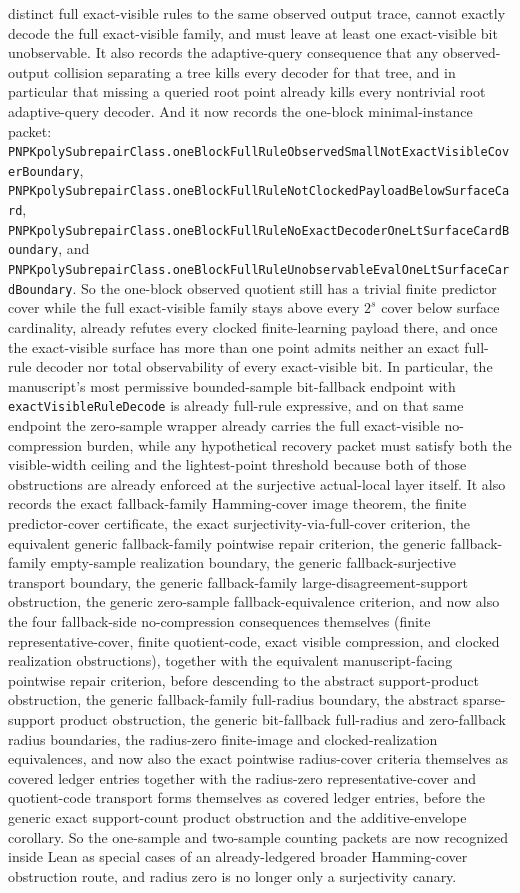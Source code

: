 \documentclass[11pt]{article}
\theoremstyle{remark}
\begin{document}
distinct full exact-visible rules to the same observed output trace, cannot
exactly decode the full exact-visible family, and must leave at least one
exact-visible bit unobservable.
It also records the adaptive-query consequence that any observed-output
collision separating a tree kills every decoder for that tree, and in
particular that missing a queried root point already kills every nontrivial
root adaptive-query decoder.
And it now records the one-block minimal-instance packet:
\texttt{PNPKpolySubrepairClass.oneBlockFullRuleObservedSmallNotExactVisibleCoverBoundary},
\texttt{PNPKpolySubrepairClass.oneBlockFullRuleNotClockedPayloadBelowSurfaceCard},
\texttt{PNPKpolySubrepairClass.oneBlockFullRuleNoExactDecoderOneLtSurfaceCardBoundary},
and
\texttt{PNPKpolySubrepairClass.oneBlockFullRuleUnobservableEvalOneLtSurfaceCardBoundary}.
So the one-block observed quotient still has a trivial finite predictor cover
while the full exact-visible family stays above every \(2^s\) cover below
surface cardinality, already refutes every clocked finite-learning payload
there, and once the exact-visible surface has more than one point admits
neither an exact full-rule decoder nor total observability of every
exact-visible bit.
In particular, the
manuscript's most permissive bounded-sample bit-fallback endpoint with
\texttt{exactVisibleRuleDecode} is already full-rule expressive, and on that
same endpoint the zero-sample wrapper already carries the full exact-visible
no-compression burden, while any hypothetical recovery packet must satisfy
both the visible-width ceiling and the lightest-point threshold because both
of those obstructions are already enforced at the surjective actual-local
layer itself.
It also records the exact fallback-family Hamming-cover image theorem, the
finite predictor-cover certificate, the exact surjectivity-via-full-cover
criterion, the equivalent generic fallback-family pointwise repair criterion,
the generic fallback-family empty-sample realization boundary, the generic
fallback-surjective transport boundary, the generic fallback-family
large-disagreement-support obstruction, the generic zero-sample
fallback-equivalence criterion, and now also the four fallback-side
no-compression consequences themselves (finite representative-cover, finite
quotient-code, exact visible compression, and clocked realization
obstructions), together with the equivalent manuscript-facing pointwise repair
criterion, before descending to
the abstract support-product
obstruction, the generic fallback-family full-radius boundary, the abstract
sparse-support product obstruction, the generic bit-fallback full-radius and
zero-fallback radius boundaries, the radius-zero finite-image and
clocked-realization equivalences, and now also the exact pointwise
radius-cover criteria themselves as covered ledger entries together with the
radius-zero representative-cover and
quotient-code transport forms themselves as covered ledger entries, before the
generic exact support-count product obstruction and the additive-envelope
corollary.  So the one-sample and
two-sample counting packets are now recognized inside Lean as special cases of
an already-ledgered broader Hamming-cover obstruction route, and radius zero
is no longer only a surjectivity canary.
\end{document}
